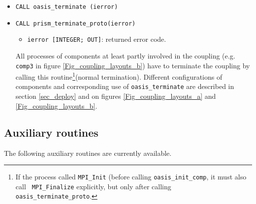 \begin{itemize}

\item {\tt CALL oasis\_terminate (ierror)}
\item {\tt CALL prism\_terminate\_proto(ierror)}
  \begin{itemize}
  \item {\tt ierror [INTEGER; OUT]}: returned error code.
  \end{itemize}
All processes of components at least partly involved in the coupling (e.g. {\tt comp3} in figure
    \ref{Fig_coupling_layouts_b}) have to terminate the coupling by
  calling this routine\footnote{If the process called {\tt MPI\_Init}
    (before calling {\tt oasis\_init\_comp}, it must also call {\tt
      MPI\_Finalize} explicitly, but only after calling {\tt
      oasis\_terminate\_proto}.}(normal termination). Different configurations of components and corresponding use of {\tt oasis\_terminate} are described in section \ref{sec_deploy} and on figures \ref{Fig_coupling_layouts_a} and \ref{Fig_coupling_layouts_b}.

  

\end{itemize}


\subsection{Auxiliary routines}
\label{subsubsec_auxroutines}

The following auxiliary routines are currently available.

